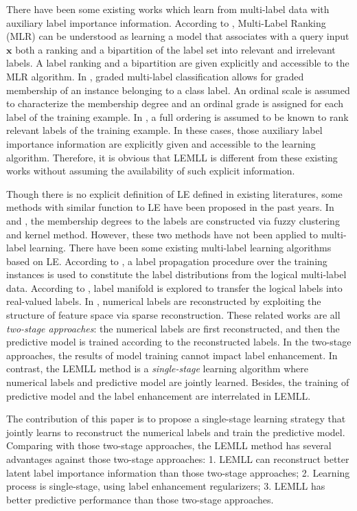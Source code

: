\documentclass[conference]{IEEEtran}
\begin{document}
There have been some existing works which learn from multi-label data with auxiliary label importance information. According to \cite{brinker2007case}, Multi-Label Ranking (MLR) can be understood as learning a model that associates with a query input $\bm{x}$ both a ranking and a bipartition of the label set into relevant and irrelevant labels. A label ranking and a bipartition are given explicitly and accessible to the MLR algorithm. In \cite{cheng2010graded}, graded multi-label classification allows for graded membership of an instance belonging to a class label. An ordinal scale is assumed to characterize the membership degree and an ordinal grade is assigned for each label of the training example. In \cite{xu2013multi}, a full ordering is assumed to be known to rank relevant labels of the training example. In these cases, those auxiliary label importance information are explicitly given and accessible to the learning algorithm. Therefore, it is obvious that LEMLL is different from these existing works without assuming the availability of such explicit information.

Though there is no explicit definition of LE defined in existing literatures, some methods with similar function to LE have been proposed in the past years. In \cite{el2006study} and \cite{jiang2006fuzzy}, the membership degrees to the labels are constructed via fuzzy clustering \cite{keller1985fuzzy} and kernel method. However, these two methods have not been applied to multi-label learning. There have been some existing multi-label learning algorithms based on LE. According to \cite{li2015leveraging}, a label propagation procedure over the training instances is used to constitute the label distributions from the logical multi-label data. According to \cite{hou2016multi}, label manifold is explored to transfer the logical labels into real-valued labels. In \cite{zhang2018feature}, numerical labels are reconstructed by exploiting the structure of feature space via sparse reconstruction. These related works are all \emph{two-stage approaches}: the numerical labels are first reconstructed, and then the predictive model is trained according to the reconstructed labels. In the two-stage approaches, the results of model training cannot impact label enhancement. In contrast, the LEMLL method is a \emph{single-stage} learning algorithm where numerical labels and predictive model are jointly learned. Besides, the training of predictive model and the label enhancement are interrelated in LEMLL.

The contribution of this paper is to propose a single-stage learning strategy that jointly learns to reconstruct the numerical labels and train the predictive model. Comparing with those two-stage approaches, the LEMLL method has several advantages against those two-stage approaches: 1. LEMLL can reconstruct better latent label importance information than those two-stage approaches; 2. Learning process is single-stage, using label enhancement regularizers; 3. LEMLL has better predictive performance than those two-stage approaches.
\end{document}
